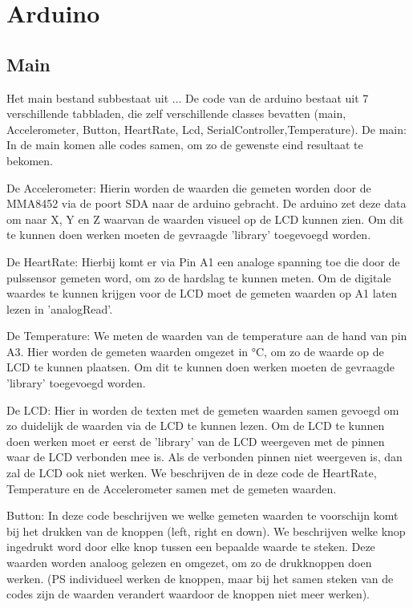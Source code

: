 \documentclass[a4paper]{report}
\begin{document}
    \section{Arduino}
        \subsection{Main}
            Het main bestand subbestaat uit ...
            De code van de arduino bestaat uit 7 verschillende tabbladen, die zelf verschillende classes bevatten
            (main, Accelerometer, Button, HeartRate, Lcd, SerialController,Temperature).
            De main:
            In de main komen alle codes samen, om zo de gewenste eind resultaat te bekomen.
            
            De Accelerometer:
            Hierin worden de waarden die gemeten worden door de MMA8452 via de poort SDA naar de arduino gebracht.
            De arduino zet deze data om naar X, Y en Z waarvan de waarden visueel op de LCD kunnen zien.
            Om dit te kunnen doen werken moeten de gevraagde 'library' toegevoegd worden.

            De HeartRate:
            Hierbij komt er via Pin A1 een analoge spanning toe die door de pulssensor gemeten word, om zo de hardslag te kunnen meten.
            Om de digitale waardes te kunnen krijgen voor de LCD moet de gemeten waarden op A1 laten lezen in 'analogRead'.

            De Temperature:
            We meten de waarden van de temperature aan de hand van pin A3.
            Hier worden de gemeten waarden omgezet in °C, om zo de waarde op de LCD te kunnen plaatsen.
            Om dit te kunnen doen werken moeten de gevraagde 'library' toegevoegd worden.

            De LCD:
            Hier in worden de texten met de gemeten waarden samen gevoegd om zo duidelijk de waarden via de LCD te kunnen lezen.
            Om de LCD te kunnen doen werken moet er eerst de 'library' van de LCD weergeven met de pinnen waar de LCD verbonden mee is.
            Als de verbonden pinnen niet weergeven is, dan zal de LCD ook niet werken.
            We beschrijven de in deze code de HeartRate, Temperature en de Accelerometer samen met de gemeten waarden.

            Button:
            In deze code beschrijven we welke gemeten waarden te voorschijn komt bij het drukken van de knoppen (left, right en down).
            We beschrijven welke knop ingedrukt word door elke knop tussen een bepaalde waarde te steken.
            Deze waarden worden analoog gelezen en omgezet, om zo de drukknoppen doen werken.
            (PS individueel werken de knoppen, maar bij het samen steken van de codes zijn de waarden verandert waardoor de knoppen niet meer werken).
\end{document}
